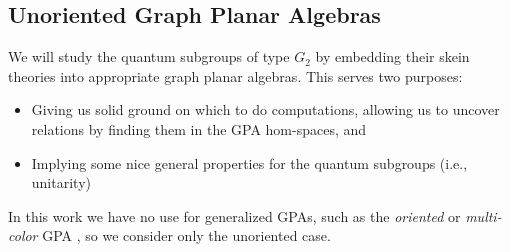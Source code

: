 \begin{comment}
\begin{proof}
    Compute directly:
    \begin{align*}
        \ldag F(f),F(f)\rdag & = \tr(F(f)^\dagger\circ F(f)) \\
        & = \tr(F(f^\dagger)\circ F(f)) \\
        & = F( \tr(f^\dagger \circ f)) \\
        & = F(0)=0
    \end{align*}
    since we assumed $f$ was negligible.
\end{proof}

As one might expect, and as was alluded to above, unitarity interacts nicely with the negligible ideal.

\begin{proposition}
    Let $\CC$ and $\DD$ be unitary, and suppose $F:\CC\to\DD$ is a pivotal dagger functor. 
    Then there is a faithful 
    $\tilde{F}:\ol{\CC} \to \ol{\DD}$
    such that
    \[
        \xymatrix@C=40pt{
        \CC \ar[r]^-{F} \ar[d] & \DD \ar[d] \\
        \ol{\CC}\ar[r]^-{\tilde{F}} & \ol{\DD}  \\
        }
    \]
    If $F$ is faithful, so is $\tilde{F}$.
\end{proposition}

\begin{proof}
    \red{ Compose $\ol{F}$ of Proposition~\ref{prop:negligible-induced-functor} with the functor $\DD \onto \ol{\DD}$. ??}
\end{proof}
\end{comment}







\subsection{Unoriented Graph Planar Algebras}
We will study the quantum subgroups of type $G_2$ by embedding their skein theories into appropriate graph planar algebras. This serves two purposes:
\begin{itemize}
    \item Giving us solid ground on which to do computations, allowing us to uncover relations by finding them in the GPA hom-spaces, and
    \item Implying some nice general properties for the quantum subgroups (i.e., unitarity)
\end{itemize}
In this work we have no use for generalized GPAs, such as the {\it oriented} \cite{Cain_Dan} or {\it multi-color} GPA \cite{emily}, 
so we consider only the unoriented case. 

